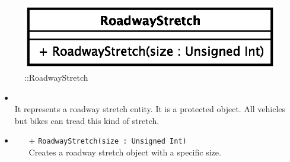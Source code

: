 \begin{figure}[h]
\centering
\includegraphics[scale=0.6,keepaspectratio]{images/solution/roadway_stretch.eps}
\caption{\pReactiveComponentStretch::RoadwayStretch}
\label{fig:sd-app-roadway_stretch}
\end{figure}
\FloatBarrier
\begin{itemize}
  \item \textbf{\descr} \\
    It represents a roadway stretch entity. It is a protected object. All
    vehicles but bikes can tread this kind of stretch.
    \item \textbf{\ops}
  \begin{itemize}
    \item[+] \texttt{RoadwayStretch(size : Unsigned Int)} \\
        Creates a roadway stretch object with a specific size.
  \end{itemize}
\end{itemize}
